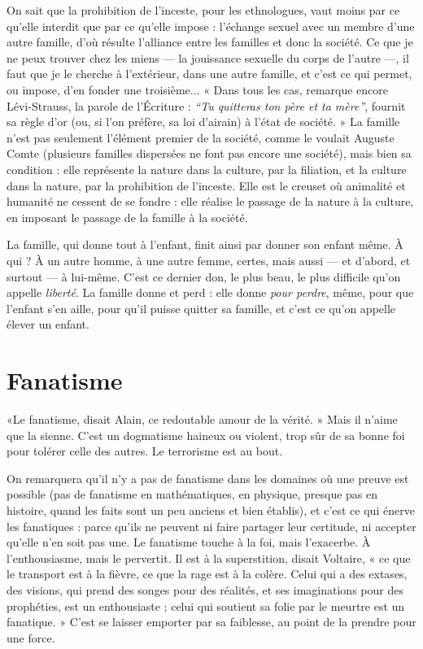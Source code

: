 On sait que la prohibition de l'inceste, pour les ethnologues, vaut moins
par ce qu’elle interdit que par ce qu’elle impose : l'échange sexuel avec un
membre d’une autre famille, d’où résulte l'alliance entre les familles et donc la
société. Ce que je ne peux trouver chez les miens — la jouissance sexuelle du
corps de l’autre —, il faut que je le cherche à l'extérieur, dans une autre famille,
et c’est ce qui permet, ou impose, d’en fonder une troisième... « Dans tous les
cas, remarque encore Lévi-Strauss, la parole de l’Écriture : {\it “Tu quitteras ton père
et ta mère”}, fournit sa règle d’or (ou, si l’on préfère, sa loi d’airain) à l’état de
société. » La famille n’est pas seulement l’élément premier de la société, comme
le voulait Auguste Comte (plusieurs familles dispersées ne font pas encore une
société), mais bien sa condition : elle représente la nature dans la culture, par la
filiation, et la culture dans la nature, par la prohibition de l'inceste. Elle est le
creuset où animalité et humanité ne cessent de se fondre : elle réalise le passage
de la nature à la culture, en imposant le passage de la famille à la société.

La famille, qui donne tout à l’enfant, finit ainsi par donner son enfant
même. À qui ? À un autre homme, à une autre femme, certes, mais aussi — et
d’abord, et surtout — à lui-même. C’est ce dernier don, le plus beau, le plus difficile
qu’on appelle {\it liberté}. La famille donne et perd : elle donne {\it pour perdre},
même, pour que l'enfant s’en aille, pour qu’il puisse quitter sa famille, et c’est
ce qu’on appelle élever un enfant.

\section{Fanatisme}
«Le fanatisme, disait Alain, ce redoutable amour de la
vérité. » Mais il n’aime que la sienne. C’est un dogmatisme
haineux ou violent, trop sûr de sa bonne foi pour tolérer celle des autres. Le terrorisme
est au bout.

On remarquera qu’il n’y a pas de fanatisme dans les domaines où une
preuve est possible (pas de fanatisme en mathématiques, en physique, presque
pas en histoire, quand les faits sont un peu anciens et bien établis), et c’est ce
qui énerve les fanatiques : parce qu’ils ne peuvent ni faire partager leur certitude,
ni accepter qu’elle n’en soit pas une. Le fanatisme touche à la foi, mais
l’exacerbe. À l'enthousiasme, mais le pervertit. Il est à la superstition, disait
Voltaire, « ce que le transport est à la fièvre, ce que la rage est à la colère. Celui
qui a des extases, des visions, qui prend des songes pour des réalités, et ses imaginations
pour des prophéties, est un enthousiaste ; celui qui soutient sa folie
par le meurtre est un fanatique. » C’est se laisser emporter par sa faiblesse, au
point de la prendre pour une force.

